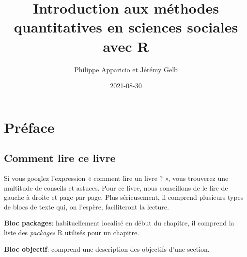 \documentclass[
  11pt,
  french,
]{book}
\title{Introduction aux méthodes quantitatives en sciences sociales avec R}
\author{Philippe Apparicio et Jérémy Gelb}
\date{2021-08-30}
\makeatletter
\newenvironment{kframev}{%
\medskip{}
\setlength{\fboxsep}{.8em}
 \def\at@end@of@kframev{}%
 \ifinner\ifhmode%
  \def\at@end@of@kframev{\end{minipage}}%
  \begin{minipage}{\columnwidth}%
 \fi\fi%
 \def\FrameCommand##1{\hskip\@totalleftmargin \hskip-\fboxsep
 \colorbox{shadebluecolor}{##1}\hskip-\fboxsep
     \hskip-\linewidth \hskip-\@totalleftmargin \hskip\columnwidth}%
 \MakeFramed {\advance\hsize-\width
   \@totalleftmargin\z@ \linewidth\hsize
   \@setminipage}}%
 {\par\unskip\endMakeFramed%
 \at@end@of@kframev}
\newenvironment{rmdblock}[1]
  {
  \begin{itemize}
  \renewcommand{\labelitemi}{
    \raisebox{-.7\height}[0pt][0pt]{
      {\setkeys{Gin}{width=3em,keepaspectratio}\texttt{[image: images/\#1]}}
    }
  }
  \setlength{\fboxsep}{1em}
  \begin{kframev}
  \small
  \item
  }
  {
  \end{kframev}
  \end{itemize}
  }
\newenvironment{bloc_package}
  {\begin{rmdblock}{package}}
  {\end{rmdblock}}
\newenvironment{bloc_objectif}
  {\begin{rmdblock}{objectif}}
  {\end{rmdblock}}
\makeatother
\begin{document}
\maketitle




\renewcommand*\contentsname{Table des matières}
{
\hypersetup{linkcolor=}
\setcounter{tocdepth}{2}
\tableofcontents
}
\listoftables
\listoffigures
\hypertarget{pruxe9face}{%
\chapter*{Préface}\label{pruxe9face}}

\hypertarget{comment-lire-ce-livre}{%
\section*{Comment lire ce livre}\label{comment-lire-ce-livre}}

Si vous googlez l'expression « comment lire un livre ? », vous trouverez une multitude de conseils et astuces. Pour ce livre, nous conseillons de le lire de gauche à droite et page par page. Plus sérieusement, il comprend plusieurs types de blocs de texte qui, on l'espère, faciliteront la lecture.

\begin{bloc_package}
\textbf{Bloc packages}: habituellement localisé en début du chapitre, il comprend la liste des \emph{packages} R utilisés pour un chapitre.

\end{bloc_package}

\begin{bloc_objectif}
\textbf{Bloc objectif}: comprend une description des objectifs d'une section.

\end{bloc_objectif}
\end{document}
